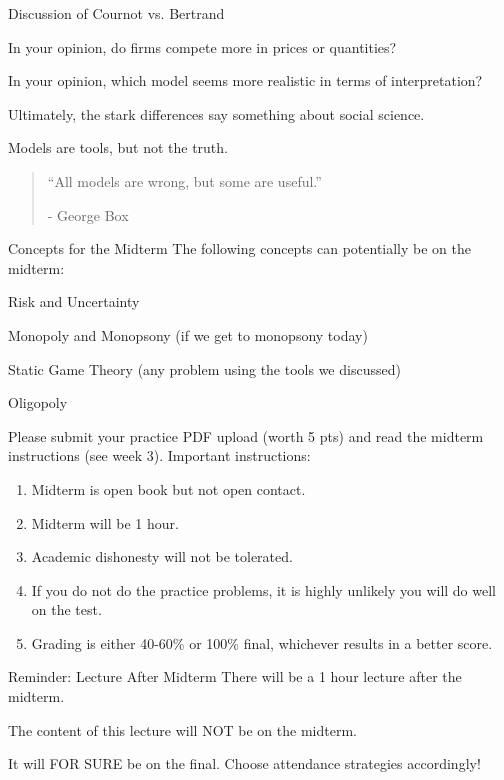 \documentclass[aspectratio=169]{beamer}
\newenvironment{wideitemize}{\itemize\addtolength{\itemsep}{10pt}}{\enditemize}
\begin{document}
\begin{frame}{Discussion of Cournot vs. Bertrand}

\begin{wideitemize}
    \item In your opinion, do firms compete more in prices or quantities?\pause
    \item In your opinion, which model seems more realistic in terms of interpretation?\pause
    \item Ultimately, the stark differences say something about social science.\pause
    \item Models are tools, but not the truth.\pause
    
\end{wideitemize}
 \vspace{4mm}
     \begin{quote}
        ``All models are wrong, but some are useful.''
        
        - George Box
    \end{quote}
    
\end{frame}
\begin{frame}{Concepts for the Midterm}
The following concepts can potentially be on the midterm:
\begin{wideitemize}
    \item Risk and Uncertainty
    \item Monopoly and Monopsony (if we get to monopsony today)
    \item Static Game Theory (any problem using the tools we discussed)
    \item Oligopoly
\end{wideitemize}

Please submit your practice PDF upload (worth 5 pts) and read the midterm instructions (see week 3). Important instructions:

\begin{enumerate}
    \item Midterm is open book but not open contact.
    \item Midterm will be 1 hour.
    \item Academic dishonesty will not be tolerated.
    \item If you do not do the practice problems, it is highly unlikely you will do well on the test.
    \item Grading is either 40-60\% or 100\% final, whichever results in a better score.
\end{enumerate}

\end{frame}

\begin{frame}{Reminder: Lecture After Midterm}
\centering
 There will be a 1 hour lecture after the midterm. 
 \vspace{7mm}
 
 The content of this lecture will NOT be on the midterm.
 
 \vspace{7mm}
 It will FOR SURE be on the final. Choose attendance strategies accordingly!
    
\end{frame}
\end{document}

